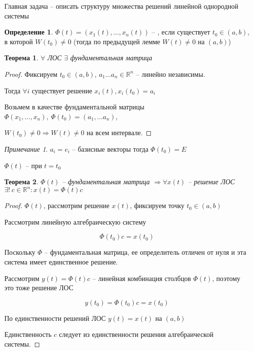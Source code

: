 \documentclass[a4paper]{article}
\theoremstyle{indented}
\newtheorem*{theorem}{Теорема}
\theoremstyle{definition}
\newtheorem*{defn}{Определение}
\theoremstyle{remark}
\newtheorem*{remark}{Примечание}
\begin{document}
Главная задача -- описать структуру множества решений линейной однородной системы


\begin{defn}
  $\Phi(t) = (x_1(t), \ldots , x_n(t))$  --  , если существует $t_0 \in (a,b)$, в которой $W(t_0) \neq 0$ (тогда по предыдущей лемме $W(t) \neq 0$ на $(a,b)$)
\end{defn}

\begin{theorem}
  $\forall $ ЛОС $\exists$ фундаментальная матрица
\end{theorem}
\begin{proof}
  Фиксируем $t_0 \in (a,b)$, $a_1\ldots a_n \in \mathbb{R}^n$ -- линейно независимы.

  Тогда $\forall i$ существует решение $x_i(t), x_i(t_0) = a_i$

  Возьмем в качестве фундаментальной матрицы $\Phi(x_1, \ldots , x_n), \ \Phi(t_0) = (a_1, \ldots a_n) $,
  
  $W(t_0) \neq 0 \Rightarrow W(t) \neq 0$ на всем интервале.

\end{proof}
\begin{remark}
  $a_i = e_i$ -- базисные векторы тогда $\Phi(t_0) = E$

  $\Phi(t)$ --  при $t = t_0$
\end{remark}

\begin{theorem}

  $\Phi(t)$ -- фундаментальная матрица $\Rightarrow \forall  x(t)$ -- решение ЛОС $\exists! \ c \in \mathbb{R}^n: x(t) = \Phi(t) c$
\end{theorem}
\begin{proof}
  $\Phi(t)$, рассмотрим решение $x(t)$, фиксируем точку $t_0 \in (a,b)$

  Рассмотрим линейную алгебраическую систему

  \[\Phi(t_0) c = x(t_0)\]

  Поскольку $\Phi$ -- фундаментальная матрица, ее определитель отличен от нуля и эта система имеет единственное решение.

  Рассмотрим $y(t) = \Phi(t)c$ -- линейная комбинация столбцов $\Phi(t)$, поэтому это тоже  решение ЛОС

  \[y(t_0) = \Phi(t_0) c = x(t_0)\]

  По единственности решений ЛОС $y(t) = x(t)$ на $(a,b)$

  Единственность $c$ следует из единственности решения алгебраической системы.
\end{proof}
\end{document}
